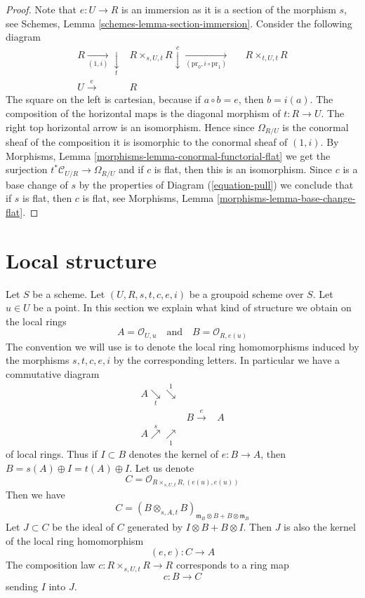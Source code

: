 \begin{proof}
Note that $e : U \to R$ is an immersion as it is a section
of the morphism $s$, see
Schemes, Lemma \ref{schemes-lemma-section-immersion}.
Consider the following diagram
$$
\begin{array}{cccc}R \underset{(1, i)}{\longrightarrow}\underset{t}{\downarrow} & R \times_{s, U, t} R \overset{c}{\downarrow}\underset{(\text{pr}_0, i \circ \text{pr}_1)}{\longrightarrow} &  & R \times_{t, U, t} R \\ U \overset{e}{\longrightarrow} & R &  & \end{array}
$$
The square on the left is cartesian, because if $a \circ b = e$, then
$b = i(a)$. The composition of the horizontal maps is the diagonal
morphism of $t : R \to U$. The right top horizontal arrow is an
isomorphism. Hence since $\Omega_{R/U}$ is the conormal sheaf of the
composition it is isomorphic to the conormal sheaf of
$(1, i)$. By
Morphisms, Lemma \ref{morphisms-lemma-conormal-functorial-flat}
we get the surjection $t^*\mathcal{C}_{U/R} \to \Omega_{R/U}$
and if $c$ is flat, then this is an isomorphism. Since $c$ is a base change
of $s$ by the properties of Diagram (\ref{equation-pull})
we conclude that if $s$ is flat, then $c$ is flat, see
Morphisms, Lemma \ref{morphisms-lemma-base-change-flat}.
\end{proof}

\section{Local structure}
\label{more-groupoids-section-local}
Let $S$ be a scheme.
Let $(U, R, s, t, c, e, i)$ be a groupoid scheme over $S$.
Let $u \in U$ be a point. In this section we explain what
kind of structure we obtain on the local rings
$$
A = \mathcal{O}_{U, u}
\quad\text{and}\quad
B = \mathcal{O}_{R, e(u)}
$$
The convention we will use is to denote the local ring homomorphisms
induced by the morphisms $s, t, c, e, i$ by the corresponding letters.
In particular we have a commutative diagram
$$
\begin{array}{ccc}A \underset{t}{\searrow}\overset{1}{\searrow} &  &  \\  & B \overset{e}{\longrightarrow} & A \\ A \overset{s}{\nearrow}\underset{1}{\nearrow} &  & \end{array}
$$
of local rings. Thus if $I \subset B$ denotes the kernel of $e : B \to A$,
then $B = s(A) \oplus I = t(A) \oplus I$. Let us denote
$$
C = \mathcal{O}_{R \times_{s, U, t} R, (e(u), e(u))}
$$
Then we have
$$
C = (B \otimes_{s, A, t} B)_{\mathfrak m_B \otimes B + B \otimes \mathfrak m_B}
$$
Let $J \subset C$ be the ideal of $C$ generated by $I \otimes B + B \otimes I$.
Then $J$ is also the kernel of the local ring homomorphism
$$
(e, e) : C \longrightarrow A
$$
The composition law $c : R \times_{s, U, t} R \to R$ corresponds to a
ring map
$$
c : B \longrightarrow C
$$
sending $I$ into $J$.

